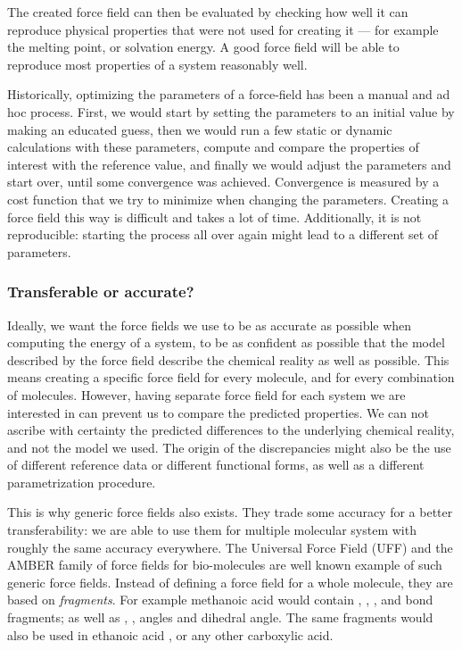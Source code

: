 \documentclass[thesis]{subfiles}
\begin{document}
The created force field can then be evaluated by checking how well it can
reproduce physical properties that were not used for creating it --- for example
the melting point, or solvation energy. A good force field will be able to
reproduce most properties of a system reasonably well.

Historically, optimizing the parameters of a force-field has been a manual and
ad hoc process. First, we would start by setting the parameters to an
initial value by making an educated guess, then we would run a few static or
dynamic calculations with these parameters, compute and compare the properties
of interest with the reference value, and finally we would adjust the parameters
and start over, until some convergence was achieved. Convergence is measured by
a cost function that we try to minimize when changing the parameters. Creating a
force field this way is difficult and takes a lot of time. Additionally, it is
not reproducible: starting the process all over again might lead to a different
set of parameters.

\subsubsection{Transferable or accurate?}

Ideally, we want the force fields we use to be as accurate as possible when
computing the energy of a system, to be as confident as possible that the model
described by the force field describe the chemical reality as well as possible.
This means creating a specific force field for every molecule, and for every
combination of molecules. However, having separate force field for each system
we are interested in can prevent us to compare the predicted properties. We can
not ascribe with certainty the predicted differences to the underlying chemical
reality, and not the model we used. The origin of the discrepancies might also
be the use of different reference data or different functional forms, as well as
a different parametrization procedure.

This is why generic force fields also exists. They trade some accuracy for a
better transferability: we are able to use them for multiple molecular system
with roughly the same accuracy everywhere. The Universal Force
Field\cite{Rappe1992} (UFF) and the AMBER family\cite{Wang2004} of force fields
for bio-molecules are well known example of such generic force fields. Instead
of defining a force field for a whole molecule, they are based on
\emph{fragments}. For example methanoic acid  would contain ,
, , and  bond fragments; as well as ,
,  angles and  dihedral angle. The same
fragments would also be used in ethanoic acid , or any other
carboxylic acid.
\end{document}
